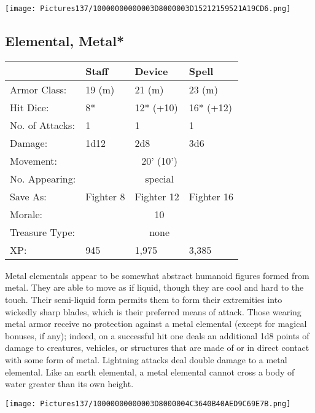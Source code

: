 \documentclass[a4paper,twoside,openany,10pt]{book}
\begin{document}
\begin{multicols}{2}
\begin{center}
	\texttt{[image: Pictures137/10000000000003D8000003D15212159521A19CD6.png]}
\end{center}


\subsection*{Elemental, Metal*}\label{elemental-metal}

\begin{tabularx}{0.48\textwidth}{@{}lllX@{}}
& Staff & Device & Spell \\\hline
Armor Class: & 19 (m) & 21 (m) & 23 (m) \\\hline
Hit Dice: & 8* & 12* (+10) & 16* (+12) \\\hline
No. of Attacks: & 1 & 1 & 1 \\\hline
Damage: & 1d12 & 2d8 & 3d6 \\\hline
Movement:  & \multicolumn{3}{c}{20' (10')}\\\hline
No. Appearing: &\multicolumn{3}{c}{special} \\\hline
Save As: & Fighter 8 & Fighter 12 & Fighter 16 \\\hline
Morale: & \multicolumn{3}{c}{10} \\\hline
Treasure Type: & \multicolumn{3}{c}{none} \\\hline
XP: & 945 & 1,975 & 3,385 \\\hline
\end{tabularx}\medskip

Metal elementals appear to be somewhat abstract humanoid figures formed from metal. They are able to move as if liquid, though they are cool and hard to the touch. Their semi-liquid form permits them to form their extremities into wickedly sharp blades, which is their preferred means of attack. Those wearing metal armor receive no protection against a metal elemental (except for magical bonuses, if any); indeed, on a successful hit one deals an additional 1d8 points of damage to creatures, vehicles, or structures that are made of or in direct contact with some form of metal. Lightning attacks deal double damage to a metal elemental. Like an earth elemental, a metal elemental cannot cross a body of water greater than its own height.

\begin{center}
	\texttt{[image: Pictures137/10000000000003D8000004C3640B40AED9C69E7B.png]}
\end{center}


\end{multicols}
\end{document}
